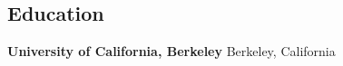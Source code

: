 \documentclass[margin,centered]{res}
\begin{document}
\begin{resume}

% 






\section{\sc Education}
{\bf University of California, Berkeley}  \hfill{ Berkeley, California}


\end{resume}
\end{document}
